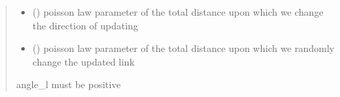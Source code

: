 \documentclass[letterpaper,10pt,english]{sphinxmanual}
\begin{document}
\begin{fulllineitems}
\begin{quote}
\begin{description}
\begin{itemize}
\item {} 
\sphinxAtStartPar
{} () \textendash{} poisson law parameter of the total distance upon which we change the direction of updating

\item {} 
\sphinxAtStartPar
{} () \textendash{} poisson law parameter of the total distance upon which we randomly change the updated link

\end{itemize}

\sphinxAtStartPar
{} \textendash{} angle\_l must be positive

\end{description}\end{quote}

\end{fulllineitems}


\begin{fulllineitems}
\label{\detokenize{ECMC:ECMC.random}}
\pysigstartsignatures
\pysiglinewithargsret
{}
{}
{}
\pysigstopsignatures
\end{fulllineitems}

\end{document}
